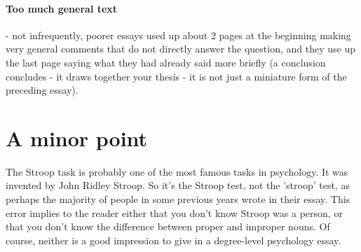 \documentclass[11pt]{article}
\begin{document}
\paragraph{Too much general text} - not infrequently, poorer essays
used up about 2 pages at the beginning making very general comments
that do not directly answer the question, and they use up the last
page saying what they had already said more briefly (a conclusion
concludes - it draws together your thesis - it is not just a miniature
form of the preceding essay).

\section*{A minor point}

The Stroop task is probably one of the most famous tasks in psychology. It was
invented by John Ridley Stroop. So it's the Stroop test, not the 'stroop' test,
as perhaps the majority of people in some previous years wrote in their
essay. This error implies to the reader either that you don't know Stroop was a
person, or that you don't know the difference between proper and improper
nouns. Of course, neither is a good impression to give in a degree-level
psychology essay.


 {}
\end{document}
